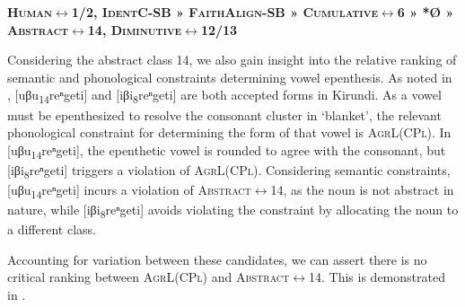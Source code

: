 \documentclass[output=paper,colorlinks,citecolor=brown,
]{langscibook}
\begin{document}
    


\begin{exe}
    \ex \label{hier1}\textbf{\textsc{Human{$\leftrightarrow$}{1/2}}, \textsc{IdentC-SB} » \textsc{FaithAlign-SB} » C\textsc{umulative{$\leftrightarrow$}{6}} » *{Ø} » \textsc{Abstract{$\leftrightarrow$}{14}}, \textsc{Diminutive{$\leftrightarrow$}{12/13}}}
    \end{exe}




Considering the abstract class 14, we also gain insight into the relative ranking of semantic and phonological constraints determining vowel epenthesis. As noted in , [uβu\textsubscript{14}reⁿgeti] and [iβi\textsubscript{8}reⁿgeti] are both accepted forms in Kirundi. As a vowel must be epenthesized to resolve the consonant cluster in `blanket', the relevant phonological constraint for determining the form of that vowel is \textsc{AgrL(CPl)}. In [uβu\textsubscript{14}reⁿgeti], the epenthetic vowel is rounded to agree with the consonant, but [iβi\textsubscript{8}reⁿgeti] triggers a violation of \textsc{AgrL(CPl)}. Considering semantic constraints, 
[uβu\textsubscript{14}reⁿgeti] incurs a violation of \textsc{Abstract{$\leftrightarrow$}{14}}, as the noun is not abstract in nature, while [iβi\textsubscript{8}reⁿgeti] avoids violating the constraint by allocating the noun to a different class. 

Accounting for variation between these candidates, we can assert there is no critical ranking between \textsc{AgrL(CPl)} and \textsc{Abstract{$\leftrightarrow$}{14}}. This is demonstrated in . 

\begin{table}
\ShadingOn
  \caption{Evaluation of /bleɪnkɪt/}
  \label{tab:kinchsular:blankettableau2}
\end{table}
\end{document}
